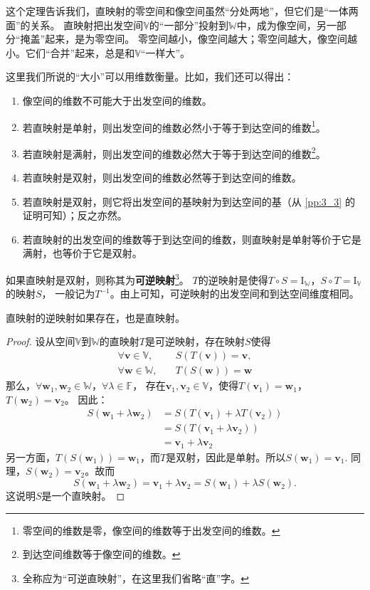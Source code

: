 \documentclass[12pt,UTF8,fontset=none]{ctexbook}
\begin{document}
这个定理告诉我们，直映射的零空间和像空间虽然“分处两地”，但它们是“一体两面”的关系。
直映射把出发空间$\mathbb{V}$的“一部分”投射到$\mathbb{W}$中，成为像空间，另一部分“掩盖”起来，是为零空间。
零空间越小，像空间越大；零空间越大，像空间越小。它们“合并”起来，总是和$\mathbb{V}$“一样大”。

这里我们所说的“大小”可以用维数衡量。比如，我们还可以得出：
\begin{enumerate}
    \item 像空间的维数不可能大于出发空间的维数。
    \item 若直映射是单射，则出发空间的维数必然小于等于到达空间的维数\footnote{零空间的维数是零，像空间的维数等于出发空间的维数。}。
    \item 若直映射是满射，则出发空间的维数必然大于等于到达空间的维数\footnote{到达空间维数等于像空间的维数。}。
    \item 若直映射是双射，则出发空间的维数必然等于到达空间的维数。
    \item 若直映射是双射，则它将出发空间的基映射为到达空间的基（从 \ref{pp:3_3} 的证明可知）；反之亦然。
    \item 若直映射的出发空间的维数等于到达空间的维数，则直映射是单射等价于它是满射，也等价于它是双射。
\end{enumerate}
如果直映射是双射，则称其为\textbf{可逆映射}\footnote{全称应为“可逆直映射”，在这里我们省略“直”字。}。
$T$的逆映射是使得$T\circ S = \mathrm{I}_{\mathbb{W}}$，$S\circ T = \mathrm{I}_{\mathbb{V}}$的映射$S$，
一般记为$T^{-1}$。由上可知，可逆映射的出发空间和到达空间维度相同。

\begin{pp}\label{pp:3_3_2}
    直映射的逆映射如果存在，也是直映射。
\end{pp}
\begin{proof} %
    设从空间$\mathbb{V}$到$\mathbb{W}$的直映射$T$是可逆映射，存在映射$S$使得
    \begin{align*}
        \forall \mathbf{v} \in \mathbb{V} ,& \quad S(T(\mathbf{v})) = \mathbf{v},   \\
        \forall \mathbf{w} \in \mathbb{W} ,& \quad T(S(\mathbf{w})) = \mathbf{w} 
    \end{align*}
    那么，$\forall \mathbf{w}_1, \mathbf{w}_2 \in \mathbb{W}$，$\forall \lambda \in \mathbb{F}$，
    存在$\mathbf{v}_1, \mathbf{v}_2 \in \mathbb{V}$，使得$T(\mathbf{v}_1) = \mathbf{w}_1$，$T(\mathbf{w}_2) = \mathbf{v}_2$。
    因此：
    \begin{align*}
        S(\mathbf{w}_1 + \lambda\mathbf{w}_2) &= S(T(\mathbf{v}_1) + \lambda T(\mathbf{v}_2))  \\
        &= S(T(\mathbf{v}_1 + \lambda \mathbf{v}_2))  \\
        &= \mathbf{v}_1 + \lambda \mathbf{v}_2  
    \end{align*}
    另一方面，$T(S(\mathbf{w}_1)) = \mathbf{w}_1$，而$T$是双射，因此是单射。所以$S(\mathbf{w}_1) = \mathbf{v}_1$. 
    同理，$S(\mathbf{w}_2) = \mathbf{v}_2$。故而
    $$ S(\mathbf{w}_1 + \lambda\mathbf{w}_2) = \mathbf{v}_1 + \lambda \mathbf{v}_2 = S(\mathbf{w}_1) + \lambda S(\mathbf{w}_2).$$
    这说明$S$是一个直映射。
\end{proof}
\end{document}
